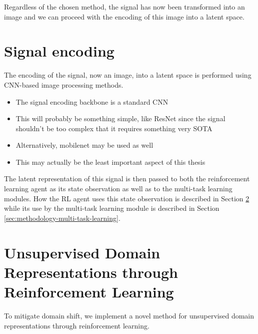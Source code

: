 Regardless of the chosen method, the signal has now been transformed into an image and we can proceed with the encoding of this image into a latent space.

\section{Signal encoding}\label{sec:methodology-signal-encoding}

The encoding of the signal, now an image, into a latent space is performed using CNN-based image processing methods.

\begin{itemize}
	\item The signal encoding backbone is a standard CNN
	\item This will probably be something simple, like ResNet since the signal shouldn't be too complex that it requires something very SOTA
	\item Alternatively, mobilenet may be used as well
	\item This may actually be the least important aspect of this thesis
\end{itemize}

The latent representation of this signal is then passed to both the reinforcement learning agent as its state observation as well as to the multi-task learning modules.
How the RL agent uses this state observation is described in Section \ref{sec:methodology-rl} while its use by the multi-task learning module is described in Section \ref{sec:methodology-multi-task-learning}.

\section{Unsupervised Domain Representations through Reinforcement Learning}\label{sec:methodology-rl}

To mitigate domain shift, we implement a novel method for unsupervised domain representations through reinforcement learning.

